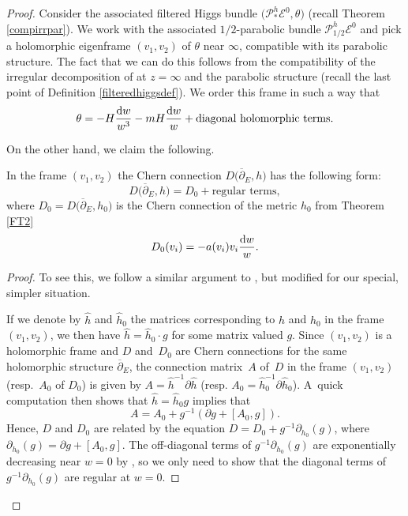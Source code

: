 \begin{proof}Consider the associated filtered Higgs bundle $\bigl(\mathcal{P}_*^h\mathcal{E}^{0},\theta\bigr)$ (recall Theorem \ref{compirrpar}). We work with the associated $1/2$-parabolic bundle $\mathcal{P}_{1/2}^h\mathcal{E}^{0}$ and pick a holomorphic eigenframe $(v_1,v_2)$ of $\theta$ near $\infty$, compatible with its parabolic structure. The fact that we can do this follows from the compatibility of the irregular decomposition of  at $z=\infty$ and the parabolic structure (recall the last point of Definition \ref{filteredhiggsdef}). We order this frame in such a way that
\begin{equation*}
\theta= -H\frac{{\rm d}w}{w^3}-mH\frac{{\rm d}w}{w}+\text{diagonal holomorphic terms.}
\end{equation*}

On the other hand, we claim the following.

\begin{Lemma}\label{connlem}
In the frame $(v_1,v_2)$ the Chern connection $D\bigl(\overline{\partial}_E,h\bigr)$ has the following form:
\begin{equation*}
 D\bigl(\overline{\partial}_E,h\bigr)=D_0 + \text{regular terms},
\end{equation*}
where $D_0=D\bigl(\overline{\partial}_E,h_0\bigr)$ is the Chern connection of the metric $h_0$ from Theorem {\rm\ref{FT2}}
\begin{equation*}
 D_0(v_i)=-a(v_i)v_i\frac{{\rm d}w}{w}.
\end{equation*}

\end{Lemma}
\begin{proof}
To see this, we follow a similar argument to \cite[Proposition 10.3.3]{M}, but modified for our special, simpler situation.

If we denote by $\hat{h}$ and $\hat{h}_0$ the matrices corresponding to $h$ and $h_0$ in the frame $(v_1,v_2)$, we then have $\hat{h}=\hat{h}_0\cdot g$ for some matrix valued $g$. Since $(v_1,v_2)$ is a holomorphic frame and $D$ and~$D_0$ are Chern connections for the same holomorphic structure $\overline{\partial}_E$, the connection matrix~$A$ of~$D$ in the frame $(v_1,v_2)$ (resp.\ $A_0$ of $D_0$) is given by
$A=\hat{h}^{-1}\partial \hat{h}$ (resp. $A_0=\hat{h}_0^{-1}\partial \hat{h}_0$).
A~quick computation then shows that $\hat{h}=\hat{h}_0g$ implies that
\begin{equation*}
 A=A_0+g^{-1}(\partial g +[A_0,g]).
\end{equation*}
Hence, $D$ and $D_0$ are related by the equation $D=D_0 +g^{-1}\partial_{h_0}(g)$, where ${\partial_{h_0}(g)=\partial g+[A_0,g]}$. The off-diagonal terms of $g^{-1}\partial_{h_0}(g)$ are exponentially decreasing near $w=0$ by \cite[Lem\-ma~10.1.3]{M}, so we only need to show that the diagonal terms of $g^{-1}\partial_{h_0}(g)$ are regular at $w=0$.


\end{proof}
\end{proof}

